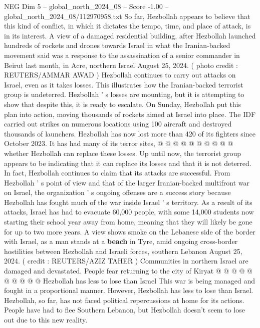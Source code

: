 \begin{textsample}{NEG Dim 5 – global\_north\_2024\_08 – Score -1.00 – global\_north\_2024\_08/112970958.txt}  \label{ex:f5_neg_063}
So far, Hezbollah appears to believe that this kind of conflict, in which it dictates the tempo, time, and place of attack, is in its interest.
A view of a damaged residential building, after Hezbollah launched hundreds of rockets and drones towards Israel in what the Iranian-backed movement said was a response to the assassination of a senior commander in Beirut last month, in Acre, northern Israel August 25, 2024. ( photo credit : REUTERS/AMMAR AWAD ) Hezbollah continues to carry out attacks on Israel, even as it takes losses.
This illustrates how the Iranian-backed terrorist group is undeterred.
Hezbollah ' s losses are mounting, but it is attempting to show that despite this, it is ready to escalate.
On Sunday, Hezbollah put this plan into action, moving thousands of rockets aimed at Israel into place.
The IDF carried out strikes on numerous locations using 100 aircraft and destroyed thousands of launchers.
Hezbollah has now lost more than 420 of its fighters since October 2023.
It has had many of its terror sites, @ @ @ @ @ @ @ @ @ @ whether Hezbollah can replace these losses.
Up until now, the terrorist group appears to be indicating that it can replace its losses and that it is not deterred.
In fact, Hezbollah continues to claim that its attacks are successful.
From Hezbollah ' s point of view and that of the larger Iranian-backed multifront war on Israel, the organization ' s ongoing offenses are a success story because Hezbollah has fought much of the war inside Israel ' s territory.
As a result of its attacks, Israel has had to evacuate 60,000 people, with some 14,000 students now starting their school year away from home, meaning that they will likely be gone for up to two more years.
A view shows smoke on the Lebanese side of the border with Israel, as a man stands at a \textbf{beach} in Tyre, amid ongoing cross-border hostilities between Hezbollah and Israeli forces, southern Lebanon August 25, 2024. ( credit : REUTERS/AZIZ TAHER ) Communities in northern Israel are damaged and devastated.
People fear returning to the city of Kiryat @ @ @ @ @ @ @ @ @ @ Hezbollah has less to lose than Israel This war is being managed and fought in a proportional manner.
However, Hezbollah has less to lose than Israel.
Hezbollah, so far, has not faced political repercussions at home for its actions.
People have had to flee Southern Lebanon, but Hezbollah doesn't seem to lose out due to this new reality.

\end{textsample}
